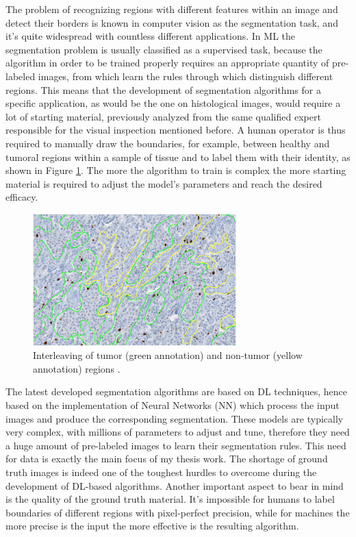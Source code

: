 The problem of recognizing regions with different features within an image and detect their borders is known in computer vision as the segmentation task, and it's quite widespread with countless different applications. In ML the segmentation problem is usually classified as a supervised task, because the algorithm in order to be trained properly requires an appropriate quantity of pre-labeled images, from which learn the rules through which distinguish different regions. This means that the development of segmentation algorithms for a specific application, as would be the one on histological images, would require a lot of starting material, previously analyzed from the same qualified expert responsible for the visual inspection mentioned before. A human operator is thus required to manually draw the boundaries, for example, between healthy and tumoral regions within a sample of tissue and to label them with their identity, as shown in Figure \ref{fig:man_seg}. The more the algorithm to train is complex the more starting material is required to adjust the model's parameters and reach the desired efficacy.

\begin{figure}
    \centering
    \includegraphics[width = 0.7\textwidth]{images/manual_seg}
    \caption{Interleaving of tumor (green annotation) and non-tumor (yellow annotation) regions \cite{Ki67}.}
    \label{fig:man_seg}
\end{figure}

The latest developed segmentation algorithms are based on DL techniques, hence based on the implementation of Neural Networks (NN) which process the input images and produce the corresponding segmentation. These models are typically very complex, with millions of parameters to adjust and tune, therefore they need a huge amount of pre-labeled images to learn their segmentation rules. This need for data is exactly the main focus of my thesis work. The shortage of ground truth images is indeed one of the toughest hurdles to overcome during the development of DL-based algorithms. Another important aspect to bear in mind is the quality of the ground truth material. It's impossible for humans to label boundaries of different regions with pixel-perfect precision, while for machines the more precise is the input the more effective is the resulting algorithm.

